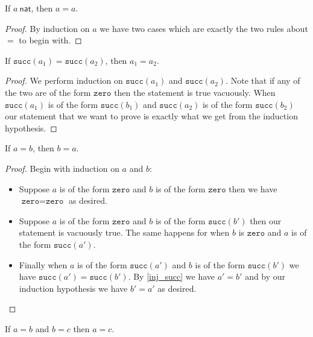\begin{lemma}[Reflexivity of $=$]
    If $a\ \mathsf{nat}$, then $a = a$.
\end{lemma}

\begin{proof}
    By induction on $a$ we have two cases which are exactly the two rules about $=$ to begin with.
\end{proof}


\begin{lemma}\label{inj_succ}
    If $\texttt{succ}(a_1) = \texttt{succ}(a_2)$, then $a_1 = a_2$.
\end{lemma}

\begin{proof}
    We perform induction on $\texttt{succ}(a_1)$ and $\texttt{succ}(a_2)$. Note that if any of the two are of the form $\texttt{zero}$ then the statement is true vacuously. When $\texttt{succ}(a_1)$ is of the form $\texttt{succ}(b_1)$ and $\texttt{succ}(a_2)$ is of the form $\texttt{succ}(b_2)$ our statement that we want to prove is exactly what we get from the induction hypothesis.
\end{proof}


\begin{lemma}[Symmetry of $=$]
    If $a = b$, then $b = a$.
\end{lemma}

\begin{proof}
    Begin with induction on $a$ and $b$:
    \begin{itemize}
        \item Suppose $a$ is of the form $\texttt{zero}$ and $b$ is of the form $\texttt{zero}$ then we have $\texttt{zero} = \texttt{zero}$ as desired.
        \item Suppose $a$ is of the form $\texttt{zero}$ and $b$ is of the form $\texttt{succ}(b')$ then our statement is vacuously true. The same happens for when $b$ is $\texttt{zero}$ and $a$ is of the form $\texttt{succ}(a')$.
        \item Finally when $a$ is of the form $\texttt{succ}(a')$ and $b$ is of the form $\texttt{succ}(b')$ we have $\texttt{succ}(a')= \texttt{succ}(b')$. By \ref{inj_succ} we have $a'=b'$ and by our induction hypothesis we have $b' = a'$ as desired.
    \end{itemize}
\end{proof}


\begin{lemma}[Transitivity of $=$]
    If $a = b$ and $b = c$ then $a = c$.
\end{lemma}


